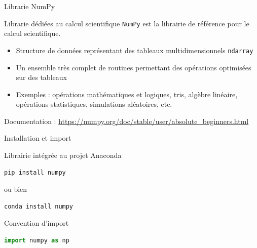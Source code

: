\documentclass[10pt]{beamer}
\begin{document}
\begin{frame}{Librarie NumPy}
  \begin{block}{Librarie dédiées au calcul scientifique}
    \medskip
    \texttt{NumPy} est la librairie de référence pour le calcul scientifique.

    \begin{itemize}
      \item Structure de données représentant des tableaux multidimensionnels \texttt{ndarray}
      \item Un ensemble très complet de routines permettant des opérations optimisées sur des tableaux
      \item Exemples : opérations mathématiques et logiques, tris, algèbre linéaire, opérations statistiques, simulations aléatoires, etc.
    \end{itemize}
  \end{block}
  Documentation : \url{https://numpy.org/doc/stable/user/absolute_beginners.html}
\end{frame}


\begin{frame}[fragile]{Installation et import}

  \begin{block}{Librairie intégrée au projet Anaconda}

\begin{lstlisting}[numbers=none]
pip install numpy
\end{lstlisting}

ou bien 

\begin{lstlisting}[numbers=none]
conda install numpy
\end{lstlisting}

\end{block}
  
\begin{block}{Convention d'import}

\begin{lstlisting}[language=python, numbers=none, morekeywords=as]
import numpy as np
\end{lstlisting}

\end{block}

\end{frame}
\end{document}

